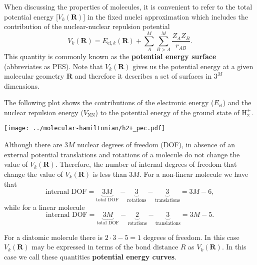 \documentclass[../Main/chem532-notes.tex]{subfiles}
\begin{document}
When discussing the properties of molecules, it is convenient to refer to the total potential energy [$V_{k}(\mathbf{R})$] in the fixed nuclei approximation which includes the contribution of the nuclear-nuclear repulsion potential
\begin{equation}
V_{k}(\mathbf{R}) = E_{\mathrm{el},k}(\mathbf{R}) + \sum_{A}^{M} \sum_{B > A}^{M} \frac{Z_A Z_B}{r_{AB}}.
\end{equation}
This quantity is commonly known as the \textbf{potential energy surface} (abbreviates as PES).
Note that $V_{k}(\mathbf{R})$ gives us the potential energy at a given molecular geometry $\mathbf{R}$ and therefore it describes a set of surfaces in $3^M$ dimensions.

\begin{example}
The following plot shows the contributions of the electronic energy ($E_\mathrm{el}$) and the nuclear repulsion energy ($V_\mathrm{NN}$) to the potential energy of the ground state of H$_2^+$.
\begin{center}
\texttt{[image: ../molecular-hamiltonian/h2+\_pec.pdf]}
\end{center}
\end{example}

Although there are $3M$ nuclear degrees of freedom (DOF), in absence of an external potential translations and rotations of a molecule do not change the value of $V_{k}(\mathbf{R})$. Therefore, the number of internal degrees of freedom that change the value of $V_{k}(\mathbf{R})$ is less than $3M$. For a non-linear molecule we have that
\begin{equation}
\text{internal DOF} = \underbrace{3 M}_{\text{total DOF}}
-\underbrace{3}_{\text{rotations}}
-\underbrace{3}_{\text{translations}} = 3M - 6,
\end{equation}
while for a linear molecule
\begin{equation}
\text{internal DOF} = \underbrace{3 M}_{\text{total DOF}}
-\underbrace{2}_{\text{rotations}}
-\underbrace{3}_{\text{translations}} =  3M - 5.
\end{equation}

\begin{example}
For a diatomic molecule there is $2\cdot3 - 5 = 1$ degrees of freedom. In this case $V_{k}(\mathbf{R})$ may be expressed in terms of the bond distance $R$ as $V_{k}(\mathbf{R})$. In this case we call these quantities \textbf{potential energy curves}.
\end{example}
\end{document}

